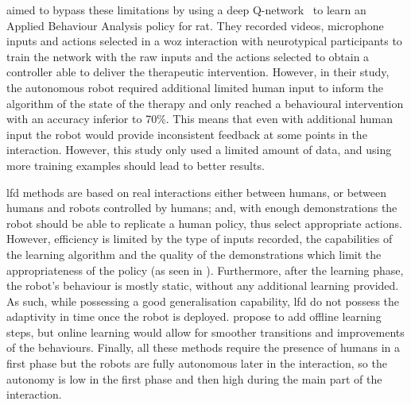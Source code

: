     \cite{clark2018deep} aimed to bypass these limitations by using a deep Q-network~\citep{mnih2015human} to learn an Applied Behaviour Analysis policy for \gls{rat}. They recorded videos, microphone inputs and actions selected in a \gls{woz} interaction with neurotypical participants to train the network with the raw inputs and the actions selected to obtain a controller able to deliver the therapeutic intervention. However, in their study, the autonomous robot required additional limited human input to inform the algorithm of the state of the therapy and only reached a behavioural intervention with an accuracy inferior to 70\%. This means that even with additional human input the robot would provide inconsistent feedback at some points in the interaction. However, this study only used a limited amount of data, and using more training examples should lead to better results.
     
    \gls{lfd} methods are based on real interactions either between humans, or between humans and robots controlled by humans; and, with enough demonstrations the robot should be able to replicate a human policy, thus select appropriate actions. However, efficiency is limited by the type of inputs recorded, the capabilities of the learning algorithm and the quality of the demonstrations which limit the appropriateness of the policy (as seen in \citealt{clark2018deep}). Furthermore, after the learning phase, the robot's behaviour is  mostly static, without any additional learning provided. As such, while possessing a good generalisation capability, \gls{lfd} do not possess the adaptivity in time once the robot is deployed. \cite{sequeira2016discovering} propose to add offline learning steps, but online learning would allow for smoother transitions and improvements of the behaviours.
    Finally, all these methods require the presence of humans in a first phase but the robots are fully autonomous later in the interaction, so the autonomy is low in the first phase and then high during the main part of the interaction.
    

